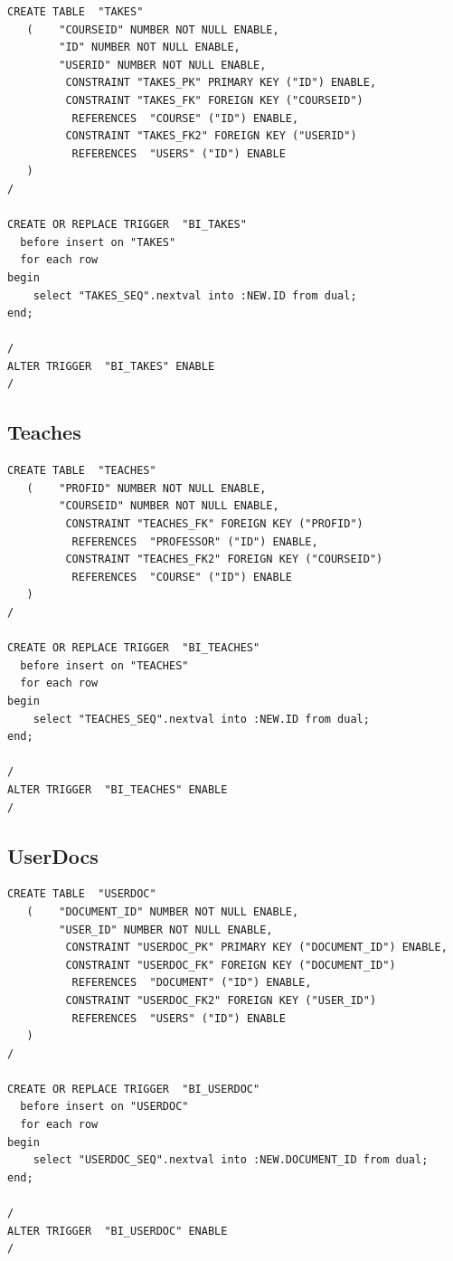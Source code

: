 \documentclass[11pt]{article}
\begin{document}
\begin{verbatim}
CREATE TABLE  "TAKES" 
   (    "COURSEID" NUMBER NOT NULL ENABLE, 
        "ID" NUMBER NOT NULL ENABLE, 
        "USERID" NUMBER NOT NULL ENABLE, 
         CONSTRAINT "TAKES_PK" PRIMARY KEY ("ID") ENABLE, 
         CONSTRAINT "TAKES_FK" FOREIGN KEY ("COURSEID")
          REFERENCES  "COURSE" ("ID") ENABLE, 
         CONSTRAINT "TAKES_FK2" FOREIGN KEY ("USERID")
          REFERENCES  "USERS" ("ID") ENABLE
   )
/

CREATE OR REPLACE TRIGGER  "BI_TAKES" 
  before insert on "TAKES"               
  for each row  
begin   
    select "TAKES_SEQ".nextval into :NEW.ID from dual; 
end; 

/
ALTER TRIGGER  "BI_TAKES" ENABLE
/
\end{verbatim}
\subsection{Teaches}
\label{sec-4-7}



\begin{verbatim}
CREATE TABLE  "TEACHES" 
   (    "PROFID" NUMBER NOT NULL ENABLE, 
        "COURSEID" NUMBER NOT NULL ENABLE, 
         CONSTRAINT "TEACHES_FK" FOREIGN KEY ("PROFID")
          REFERENCES  "PROFESSOR" ("ID") ENABLE, 
         CONSTRAINT "TEACHES_FK2" FOREIGN KEY ("COURSEID")
          REFERENCES  "COURSE" ("ID") ENABLE
   )
/

CREATE OR REPLACE TRIGGER  "BI_TEACHES" 
  before insert on "TEACHES"               
  for each row  
begin   
    select "TEACHES_SEQ".nextval into :NEW.ID from dual; 
end; 

/
ALTER TRIGGER  "BI_TEACHES" ENABLE
/
\end{verbatim}
\subsection{UserDocs}
\label{sec-4-8}



\begin{verbatim}
CREATE TABLE  "USERDOC" 
   (    "DOCUMENT_ID" NUMBER NOT NULL ENABLE, 
        "USER_ID" NUMBER NOT NULL ENABLE, 
         CONSTRAINT "USERDOC_PK" PRIMARY KEY ("DOCUMENT_ID") ENABLE, 
         CONSTRAINT "USERDOC_FK" FOREIGN KEY ("DOCUMENT_ID")
          REFERENCES  "DOCUMENT" ("ID") ENABLE, 
         CONSTRAINT "USERDOC_FK2" FOREIGN KEY ("USER_ID")
          REFERENCES  "USERS" ("ID") ENABLE
   )
/

CREATE OR REPLACE TRIGGER  "BI_USERDOC" 
  before insert on "USERDOC"               
  for each row  
begin   
    select "USERDOC_SEQ".nextval into :NEW.DOCUMENT_ID from dual; 
end; 

/
ALTER TRIGGER  "BI_USERDOC" ENABLE
/
\end{verbatim}
\end{document}

